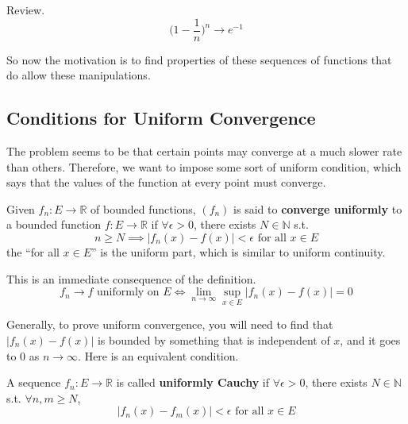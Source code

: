   \begin{example}
    Review. 
    \begin{equation}
      \bigg( 1 - \frac{1}{n} \bigg)^n \to e^{-1}
    \end{equation}
  \end{example}

  So now the motivation is to find properties of these sequences of functions that do allow these manipulations. 

\subsection{Conditions for Uniform Convergence}

  The problem seems to be that certain points may converge at a much slower rate than others. Therefore, we want to impose some sort of uniform condition, which says that the values of the function at every point must converge. 

  \begin{definition}
    Given $f_n : E \to \mathbb{R}$ of bounded functions, $(f_n)$ is said to \textbf{converge uniformly} to a bounded function $f: E \to \mathbb{R}$ if $\forall \epsilon > 0$, there exists $N \in \mathbb{N}$ s.t. 
    \begin{equation}
      n \geq N \implies |f_n (x) - f(x) | < \epsilon \text{ for all } x \in E
    \end{equation}
    the ``for all $x \in E$'' is the uniform part, which is similar to uniform continuity. 
  \end{definition}

  \begin{theorem}
    This is an immediate consequence of the definition. 
    \begin{equation}
      f_n \to f \text{ uniformly on } E \iff \lim_{n \to \infty} \sup_{x \in E} |f_n (x) - f(x)| = 0
    \end{equation}
  \end{theorem}

  Generally, to prove uniform convergence, you will need to find that $|f_n (x) - f(x)|$ is bounded by something that is independent of $x$, and it goes to $0$ as $n \to \infty$. Here is an equivalent condition. 

  \begin{definition}
    A sequence $f_n: E \to \mathbb{R}$ is called \textbf{uniformly Cauchy} if $\forall \epsilon > 0$, there exists $N \in \mathbb{N}$ s.t. $\forall n, m \geq N$, 
    \begin{equation}
      |f_n (x) - f_m (x)| < \epsilon \text{ for all } x \in E
    \end{equation}
  \end{definition}


